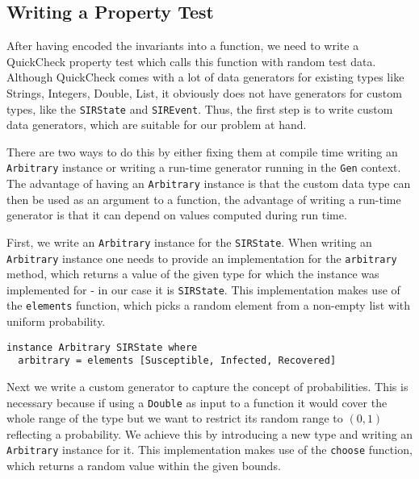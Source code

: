 \subsection{Writing a Property Test}
After having encoded the invariants into a function, we need to write a QuickCheck property test which calls this function with random test data. Although QuickCheck comes with a lot of data generators for existing types like Strings, Integers, Double, List, it obviously does not have generators for custom types, like the \texttt{SIRState} and \texttt{SIREvent}. Thus, the first step is to write custom data generators, which are suitable for our problem at hand.

There are two ways to do this by either fixing them at compile time writing an \texttt{Arbitrary} instance or writing a run-time generator running in the \texttt{Gen} context. The advantage of having an \texttt{Arbitrary} instance is that the custom data type can then be used as an argument to a function, the advantage of writing a run-time generator is that it can depend on values computed during run time.

First, we write an \texttt{Arbitrary} instance for the \texttt{SIRState}. When writing an \texttt{Arbitrary} instance one needs to provide an implementation for the \texttt{arbitrary} method, which returns a value of the given type for which the instance was implemented for - in our case it is \texttt{SIRState}. This implementation makes use of the \texttt{elements} function, which picks a random element from a non-empty list with uniform probability.

\begin{footnotesize}
\begin{verbatim}
instance Arbitrary SIRState where
  arbitrary = elements [Susceptible, Infected, Recovered]
\end{verbatim}
\end{footnotesize}

Next we write a custom generator to capture the concept of probabilities. This is necessary because if using a \texttt{Double} as input to a function it would cover the whole range of the type but we want to restrict its random range to $(0,1)$ reflecting a probability. We achieve this by introducing a new type and writing an \texttt{Arbitrary} instance for it. This implementation makes use of the \texttt{choose} function, which returns a random value within the given bounds.


